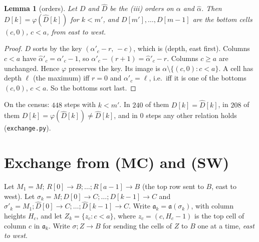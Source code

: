 \documentclass[11pt]{article}
\newtheorem{lemma}[theorem]{Lemma}
\theoremstyle{definition}
\newcommand{\toB}{\!\to\! B}
\newcommand{\toC}{\!\to\! C}
\newcommand{\fa}{\mathfrak a}
\begin{document}
\begin{lemma}[orders]\label{lem:orders}
Let $D$ and $\hat D$ be the (iii) orders on $\alpha$ and $\hat\alpha$. Then $D[k]=\varphi(\hat D[k])$ for $k<m'$, and $D[m'],\dots,D[m-1]$
are the bottom cells $(c,0)$, $c<a$, from east to west.
\end{lemma}
\begin{proof}
$D$ sorts by the key $(\alpha'_c-r,\,-c)$, which is (depth, east first). Columns $c<a$ have $\hat\alpha'_c=\alpha'_c-1$, so
$\alpha'_c-(r+1)=\hat\alpha'_c-r$. Columns $c\ge a$ are unchanged. Hence $\varphi$ preserves the key. Its image is
$\alpha\setminus\{(c,0):c<a\}$. A cell has depth $\ell$ (the maximum) iff $r=0$ and $\alpha'_c=\ell$, i.e.\ iff it is one of
the bottoms $(c,0)$, $c<a$. So the bottoms sort last.
\end{proof}
On the census: $448$ steps with $k<m'$. In $240$ of them $D[k]=\hat D[k]$, in $208$ of them $D[k]=\varphi(\hat D[k])\neq\hat D[k]$, and in $0$ steps
any other relation holds (\texttt{exchange.py}).

\section{Exchange from (MC) and (SW)}
Let $M_1=M;\,R[0]\toB;\dots;R[a-1]\toB$ (the top row sent to $B$, east to west). Let $\sigma_k=M;D[0]\toC;\dots;D[k-1]\toC$ and
$\sigma'_k=M_1;\hat D[0]\toC;\dots;\hat D[k-1]\toC$. Write $\fa_k=\fa(\sigma_k)$, with column heights $H_c$, and let $Z_k=\{z_c:c<a\}$, where
$z_c=(c,H_c-1)$ is the top cell of column $c$ in $\fa_k$. Write $\sigma;Z\toB$ for sending the cells of $Z$ to $B$ one at a
time, \emph{east to west}.
\end{document}
